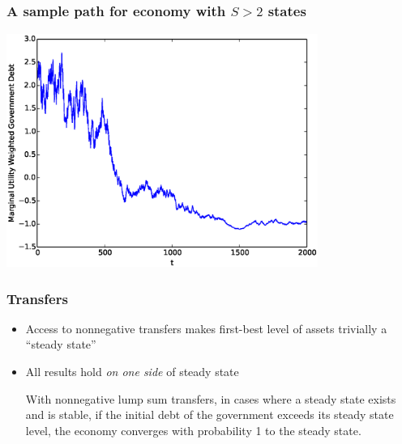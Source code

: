 \documentclass{beamer}
\begin{document}
\subsection{}

\begin{frame}
	\frametitle{A sample path  for economy with $S>2$ states}
	\begin{center}
	\includegraphics[width=4in]{Images/5stateiid.eps}
	\end{center}
\end{frame}



 \begin{frame}
  \frametitle{Transfers}
	\begin{itemize}	
	\item Access to nonnegative transfers makes first-best level of assets trivially a ``steady state''  	
\item  All results hold \textit{on one side} of steady state
\begin{theorem}

With nonnegative lump sum transfers,  in cases where a steady state exists and is stable,  if the initial debt of the government exceeds its steady state level,  the economy  converges with probability 1 to the steady state.

\end{theorem}
		
	\end{itemize}
 \end{frame}
\end{document}
